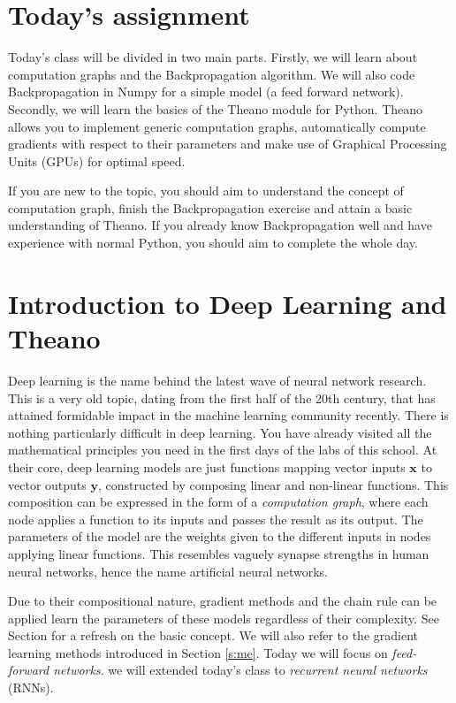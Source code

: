 \section{Today's assignment}
Today's class will be divided in two main parts. Firstly, we will learn about
computation graphs and the Backpropagation algorithm. We will also code
Backpropagation in Numpy for a simple model (a feed forward network). Secondly,
we will learn the basics of the Theano module for Python. Theano allows you to
implement  generic computation graphs, automatically compute gradients with
respect to their parameters and make use of Graphical Processing Units (GPUs)
for optimal speed. 

If you are new to the topic, you should aim to understand the concept of computation graph, 
finish the Backpropagation exercise and attain a basic understanding of Theano.
If you already know Backpropagation well and have experience with normal
Python, you should aim to complete the whole day. 

\section{Introduction to Deep Learning and Theano}

Deep learning is the name behind the latest wave of neural network research.
This is a very old topic, dating from the first half of the 20th century, that
has attained formidable impact in the machine learning community recently. 
There is nothing particularly difficult in deep learning. You have already
visited all the mathematical principles you need in the first days of the
labs of this school. At their core, deep learning models are just functions
mapping vector inputs $\mathbf{x}$ to vector outputs $\mathbf{y}$, constructed by
composing linear and non-linear functions. This composition can be expressed in
the form of a \textit{computation graph}, where each node applies a function to
its inputs and passes the result as its output. The parameters of the model are
the weights given to the different inputs in nodes applying linear
functions. This resembles vaguely synapse strengths in human neural networks,
hence the name artificial neural networks. 

Due to their compositional nature, gradient methods and the chain rule can be
applied learn the parameters of these models regardless of their complexity.
See Section \label{gradient_methods} for a refresh on the basic concept. We
will also refer to the gradient learning methods introduced in Section
\ref{s:me}. Today we will focus on \textit{feed-forward networks}. we will
extended today's class to \textit{recurrent neural networks} (RNNs).  

